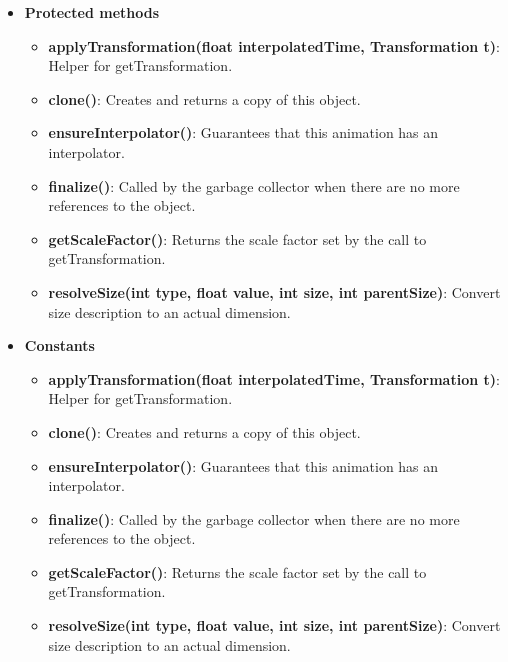 \documentclass{report}
\begin{document}
\begin{itemize}
        \item \textbf{Protected methods}
            \begin{itemize}
                \item \textbf{applyTransformation(float interpolatedTime, Transformation t)}: Helper for getTransformation.
                \item \textbf{clone()}: Creates and returns a copy of this object.
                \item \textbf{ensureInterpolator()}: Guarantees that this animation has an interpolator.
                \item \textbf{finalize()}: Called by the garbage collector when there are no more references to the object.
                \item \textbf{getScaleFactor()}: Returns the scale factor set by the call to getTransformation.
                \item \textbf{resolveSize(int type, float value, int size, int parentSize)}: Convert size description to an actual dimension.
            \end{itemize}
        \item \textbf{Constants}
            \begin{itemize}
                \item \textbf{applyTransformation(float interpolatedTime, Transformation t)}: Helper for getTransformation.
                \item \textbf{clone()}: Creates and returns a copy of this object.
                \item \textbf{ensureInterpolator()}: Guarantees that this animation has an interpolator.
                \item \textbf{finalize()}: Called by the garbage collector when there are no more references to the object.
                \item \textbf{getScaleFactor()}: Returns the scale factor set by the call to getTransformation.
                \item \textbf{resolveSize(int type, float value, int size, int parentSize)}: Convert size description to an actual dimension.
            \end{itemize}

    \end{itemize}


    \pagebreak 
\end{document}
